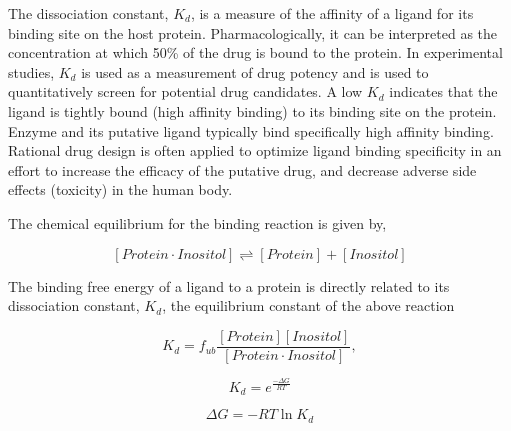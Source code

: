 
The dissociation constant, $K_d$, is a measure of the affinity of a ligand for its binding site on the host protein. Pharmacologically, it can be interpreted as the concentration at which 50\% of the drug is bound to the protein. In experimental studies, $K_d$ is used as a measurement of drug potency and is used to quantitatively screen for potential drug candidates.  A low $K_d$ indicates that the ligand is tightly bound (high affinity binding) to its binding site on the protein.  Enzyme and its putative ligand typically bind specifically high affinity binding.  Rational drug design is often applied to optimize ligand binding specificity in an effort to increase the efficacy of the putative drug, and decrease adverse side effects (toxicity) in the human body.

The chemical equilibrium for the binding reaction is given by,

    \begin{equation}
      \left[ Protein\cdot Inositol \right] 
      \rightleftharpoons 
      \left[ Protein \right]+\left[ Inositol \right]
    \end{equation}
  
    
The binding free energy of a ligand to a protein is directly related to its dissociation constant, $K_d$, the equilibrium constant of the above reaction

    
     \begin{equation}
        K_{d} = f_{ub}\frac{\left[ Protein \right]\left[ Inositol \right]}{\left[Protein \cdot Inositol\right]},
     \end{equation}
     
     \begin{equation}
        K_{d} = e^{\frac{-\Delta G}{RT}}
     \end{equation}

     \begin{equation}
        \Delta G = -RT\ln K_d
     \end{equation}
     
